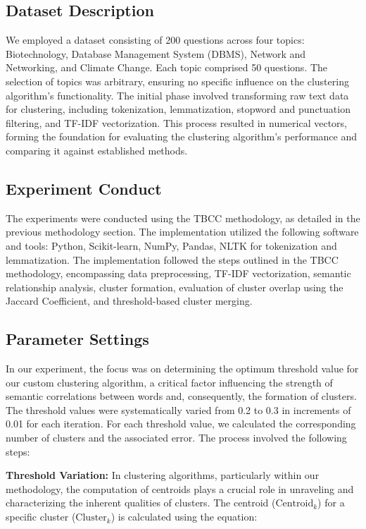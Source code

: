 \documentclass{article}
\begin{document}
\subsection{Dataset Description}
We employed a dataset consisting of 200 questions across four topics: Biotechnology, Database Management System (DBMS), Network and Networking, and Climate Change. Each topic comprised 50 questions. The selection of topics was arbitrary, ensuring no specific influence on the clustering algorithm's functionality. The initial phase involved transforming raw text data for clustering, including tokenization, lemmatization, stopword and punctuation filtering, and TF-IDF vectorization. This process resulted in numerical vectors, forming the foundation for evaluating the clustering algorithm's performance and comparing it against established methods.
\subsection{Experiment Conduct}

The experiments were conducted using the TBCC methodology, as detailed in the previous methodology section. The implementation utilized the following software and tools: Python, Scikit-learn, NumPy, Pandas, NLTK for tokenization and lemmatization. The implementation followed the steps outlined in the TBCC methodology, encompassing data preprocessing, TF-IDF vectorization, semantic relationship analysis, cluster formation, evaluation of cluster overlap using the Jaccard Coefficient, and threshold-based cluster merging.

\subsection{Parameter Settings}

In our experiment, the focus was on determining the optimum threshold value for our custom clustering algorithm, a critical factor influencing the strength of semantic correlations between words and, consequently, the formation of clusters. The threshold values were systematically varied from 0.2 to 0.3 in increments of 0.01 for each iteration. For each threshold value, we calculated the corresponding number of clusters and the associated error. The process involved the following steps:

\textbf{Threshold Variation: } In clustering algorithms, particularly within our methodology, the computation of centroids plays a crucial role in unraveling and characterizing the inherent qualities of clusters. The centroid (\( \text{Centroid}_k \)) for a specific cluster (\( \text{Cluster}_k \)) is calculated using the equation:
\end{document}
